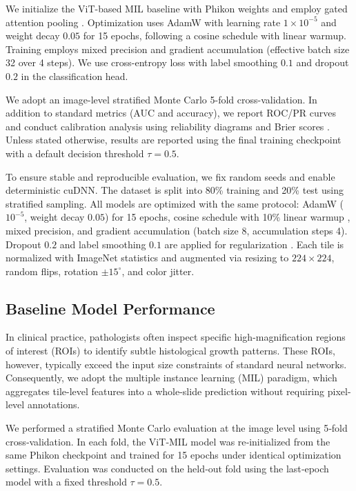 \documentclass[journal]{IEEEtran}
\theoremstyle{remark}
\begin{document}
We initialize the ViT-based MIL baseline with Phikon weights \cite{filiot2023scaling} and employ gated attention pooling \cite{ilse2018attention}. Optimization uses AdamW \cite{loshchilov2017decoupled} with learning rate $1 \times 10^{-5}$ and weight decay $0.05$ for 15 epochs, following a cosine schedule with linear warmup. Training employs mixed precision \cite{micikevicius2017mixed} and gradient accumulation (effective batch size 32 over 4 steps). We use cross-entropy loss with label smoothing $0.1$ \cite{szegedy2016rethinking} and dropout $0.2$ in the classification head.

We adopt an image-level stratified Monte Carlo 5-fold cross-validation. In addition to standard metrics (AUC and accuracy), we report ROC/PR curves and conduct calibration analysis using reliability diagrams and Brier scores \cite{guo2017calibration}. Unless stated otherwise, results are reported using the final training checkpoint with a default decision threshold $\tau = 0.5$.

To ensure stable and reproducible evaluation, we fix random seeds and enable deterministic cuDNN. The dataset is split into 80\% training and 20\% test using stratified sampling. All models are optimized with the same protocol: AdamW \cite{loshchilov2017decoupled} ($10^{-5}$, weight decay $0.05$) for 15 epochs, cosine schedule with 10\% linear warmup \cite{loshchilov2016sgdr}, mixed precision, and gradient accumulation (batch size 8, accumulation steps 4). Dropout $0.2$ and label smoothing $0.1$ are applied for regularization \cite{szegedy2016rethinking}. Each tile is normalized with ImageNet statistics \cite{imagenet} and augmented via resizing to $224 \times 224$, random flips, rotation $\pm 15^\circ$, and color jitter. 

\subsection{Baseline Model Performance}\label{S3-2}

In clinical practice, pathologists often inspect specific high-magnification regions of interest (ROIs) to identify subtle histological growth patterns. These ROIs, however, typically exceed the input size constraints of standard neural networks. Consequently, we adopt the multiple instance learning (MIL) paradigm, which aggregates tile-level features into a whole-slide prediction without requiring pixel-level annotations.

We performed a stratified Monte Carlo evaluation at the image level using 5‑fold cross‑validation. In each fold, the ViT‑MIL model was re‑initialized from the same Phikon checkpoint and trained for 15 epochs under identical optimization settings. Evaluation was conducted on the held‑out fold using the last‑epoch model with a fixed threshold $\tau = 0.5$. 
\end{document}
